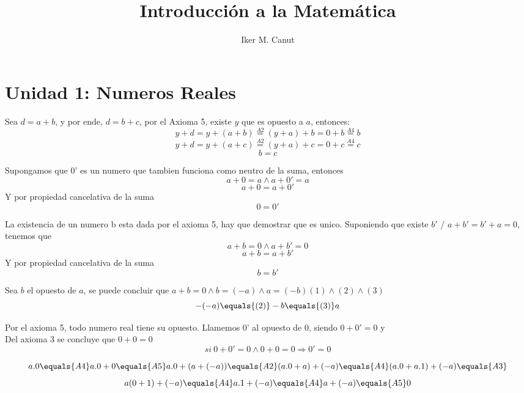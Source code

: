 \documentclass[10pt]{article}
\author{Iker M. Canut}
\begin{document}
\title{Introducción a la Matemática}
\maketitle
\date
\newpage

\tableofcontents
\newpage

\section{Unidad 1: Numeros Reales}

\begin{prf}{}
Sea $d=a+b$, y por ende, $d=b+c$, por el Axioma 5, existe $y$ que es opuesto  a $a$, entonces:
$$y+d=y+(a+b) \overset{A2}{=} (y+a)+b = 0 + b \overset{A4}{=}b$$
$$y+d=y+(a+c) \overset{A2}{=} (y+a)+c = 0 + c \overset{A4}{=}c$$
$$b=c$$
\end{prf}

\begin{prf}{}
Supongamos que 0' es un numero que tambien funciona como neutro de la suma, entonces
$$a+0=a \land a+0'=a$$
$$a+0=a+0'$$
Y por propiedad cancelativa de la suma
$$0=0'$$
\end{prf}

\begin{prf}{}
La existencia de un numero b esta dada por el axioma 5, hay que demostrar que es unico. Suponiendo que existe $b'$ / $a+b'=b'+a=0$, tenemos que
$$a+b=0 \land a+b'=0$$
$$a+b = a+b'$$
Y por propiedad cancelativa de la suma
$$b=b'$$
\end{prf}

\begin{prf}[$-(-a) = a$]{}
Sea $b$ el opuesto de $a$, se puede concluir que $a+b=0 \land b=(-a) \land a=(-b)$\hfill$(1)\land(2)\land(3)$
$$-(-a)\equals{(2)}-b\equals{(3)}a$$
\end{prf}

\begin{prf}[$-0 = 0$]{}
Por el axioma 5, todo numero real tiene su opuesto. Llamemos 0' al opuesto de 0, siendo $0+0'=0$ y\\
Del axioma 3 se concluye que $0+0=0$
$$si\ 0+0'=0 \land 0+0=0 \Rightarrow 0'=0$$
\end{prf}

\begin{prf}[$0.a = 0$]{}
	$$a.0 \equals{A4} a.0+0 \equals{A5} a.0+(a+(-a)) \equals{A2} (a.0+a)+(-a) \equals{A4} (a.0+a.1)+(-a) \equals{A3}$$
	$$a(0+1)+(-a) \equals{A4} a.1+(-a) \equals{A4} a+(-a) \equals{A5} 0$$
\end{prf}
\end{document}
